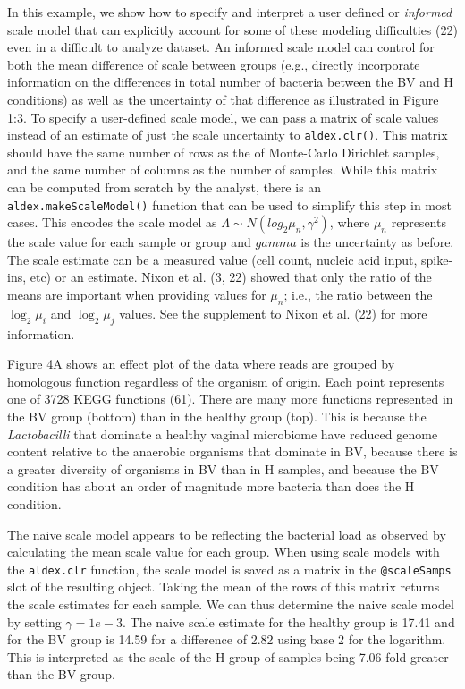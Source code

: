 \documentclass[
]{article}
\begin{document}
In this example, we show how to specify and interpret a user defined or
\emph{informed} scale model that can explicitly account for some of
these modeling difficulties (22) even in a difficult to analyze dataset.
An informed scale model can control for both the mean difference of
scale between groups (e.g., directly incorporate information on the
differences in total number of bacteria between the BV and H conditions)
as well as the uncertainty of that difference as illustrated in Figure
1:3. To specify a user-defined scale model, we can pass a matrix of
scale values instead of an estimate of just the scale uncertainty to
\texttt{aldex.clr()}. This matrix should have the same number of rows as
the of Monte-Carlo Dirichlet samples, and the same number of columns as
the number of samples. While this matrix can be computed from scratch by
the analyst, there is an \texttt{aldex.makeScaleModel()} function that
can be used to simplify this step in most cases. This encodes the scale
model as \(\Lambda \sim N(log_2 \mu_n, \gamma^{2})\), where \(\mu_n\)
represents the scale value for each sample or group and \(gamma\) is the
uncertainty as before. The scale estimate can be a measured value (cell
count, nucleic acid input, spike-ins, etc) or an estimate. Nixon et al.
(3, 22) showed that only the ratio of the means are important when
providing values for \(\mu_n\); i.e., the ratio between the
\(\log_2 \mu_i\) and \(\log_2 \mu_j\) values. See the supplement to
Nixon et al. (22) for more information.

Figure 4A shows an effect plot of the data where reads are grouped by
homologous function regardless of the organism of origin. Each point
represents one of 3728 KEGG functions (61). There are many more
functions represented in the BV group (bottom) than in the healthy group
(top). This is because the \textit{Lactobacilli} that dominate a healthy
vaginal microbiome have reduced genome content relative to the anaerobic
organisms that dominate in BV, because there is a greater diversity of
organisms in BV than in H samples, and because the BV condition has
about an order of magnitude more bacteria than does the H condition.

The naive scale model appears to be reflecting the bacterial load as
observed by calculating the mean scale value for each group. When using
scale models with the \texttt{aldex.clr} function, the scale model is
saved as a matrix in the \texttt{@scaleSamps} slot of the resulting
object. Taking the mean of the rows of this matrix returns the scale
estimates for each sample. We can thus determine the naive scale model
by setting \(\gamma=1e-3\). The naive scale estimate for the healthy
group is 17.41 and for the BV group is 14.59 for a difference of 2.82
using base 2 for the logarithm. This is interpreted as the scale of the
H group of samples being 7.06 fold greater than the BV group.
\end{document}
